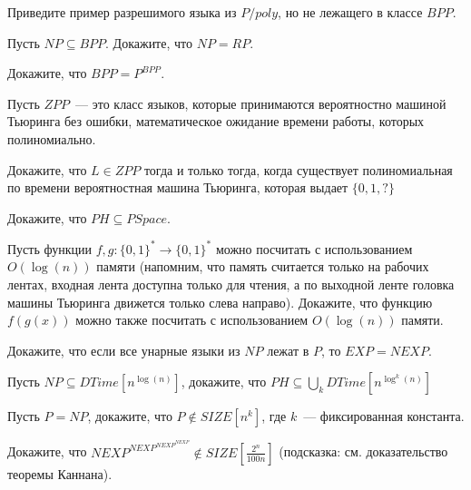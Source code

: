 \setcounter{curtask}{50}


\begin{task}
    Приведите пример разрешимого языка из $P/poly$, но не лежащего в классе $BPP$.
\end{task}

\begin{task}
    Пусть $NP \subseteq BPP$. Докажите, что $NP = RP$.
\end{task}

\begin{task}
    Докажите, что $BPP = P^{BPP}$.
\end{task}


Пусть $ZPP$~--- это класс языков, которые принимаются вероятностно машиной Тьюринга
без ошибки, математическое ожидание времени работы, которых полиномиально.

\begin{task}
	Докажите, что $L \in ZPP$ тогда и только тогда, когда существует полиномиальная
    по времени вероятностная машина Тьюринга, которая выдает $\{0, 1, ?\}$
\end{task}



\breakline

\begin{task}
    Докажите, что $PH \subseteq PSpace$.
\end{task}

\begin{task}
    Пусть функции $f, g: \{0, 1\}^* \rightarrow \{0, 1\}^*$ можно посчитать с
    использованием $O(\log(n))$ памяти (напомним, что память считается только на
    рабочих лентах, входная лента доступна только для чтения, а по выходной ленте
    головка машины Тьюринга движется только слева направо). Докажите, что функцию
    $f(g(x))$ можно также посчитать с использованием $O(\log(n))$ памяти.
\end{task}

\begin{task}
	Докажите, что если все унарные языки из $NP$ лежат в $P$, то $EXP = NEXP$.
\end{task}

\begin{ptask}{45}
    Пусть $NP \subseteq DTime[n^{\log(n)}]$, докажите, что $PH \subseteq \bigcup\limits_{k}DTime[n^{\log^k(n)}]$
\end{ptask}


\begin{task}{48}
    Пусть $P = NP$, докажите, что $P \notin SIZE[n^k]$, где $k$~--- фиксированная константа.
\end{task}

\begin{task}{49}
    Докажите, что $NEXP^{NEXP^{NEXP^{NEXP}}} \notin SIZE[\frac{2^n}{100n}]$ (подсказка: см. доказательство теоремы Каннана).
\end{task}
